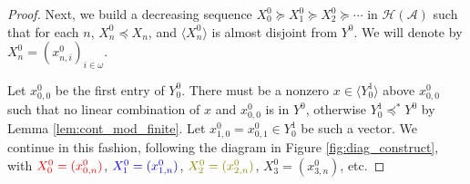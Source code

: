 \documentclass[11pt]{amsart}
\newcommand{\LA}{\mathcal{A}}
\theoremstyle{definition}
\theoremstyle{remark}
\newcommand{\LH}{\mathcal{H}}
\renewcommand{\1}{\mathbf{1}}
\begin{document}
\begin{proof}
	Next, we build a decreasing sequence $X^0_0\succeq X^0_1\succeq X^0_2\succeq\cdots$ in $\LH(\LA)$ such that for each $n$, $X^0_n\preceq X_n$, and $\langle X^0_n\rangle$ is almost disjoint from $Y^0$. We will denote by $X^0_n=(x^0_{n,i})_{i\in\omega}$.
	
%	


	Let $x^0_{0,0}$ be the first entry of $Y^0_0$. There must be a nonzero $x\in\langle Y^1_0\rangle$ above $x^0_{0,0}$ such that no linear combination of $x$ and $x^0_{0,0}$ is in $Y^0$, otherwise $Y^1_0\preceq^* Y^0$ by Lemma \ref{lem:cont_mod_finite}. Let $x^0_{1,0}=x^0_{0,1}\in Y^1_0$ be such a vector. We continue in this fashion, following the diagram in Figure \ref{fig:diag_construct}, with $\color{red}X^0_0=(x^0_{0,n})$, $\color{blue}X^0_1=(x^0_{1,n})$, $\color{olive}X^0_2=(x^0_{2,n})$, $X^0_3=(x^0_{3,n})$, etc.
	

\end{proof}
\end{document}
